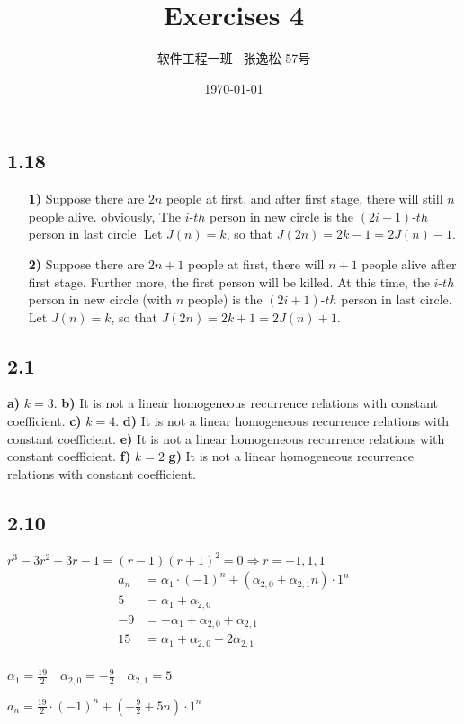 \documentclass[10pt]{ctexart}
\title{Exercises 4}
\author{软件工程一班 \ 张逸松 57号}
\date{\today}
\begin{document}
    \maketitle
    \subsection*{1.18}
        \begin{itemize}
            \item [\textbf{1)}] Suppose there are $2n$ people at first, and after first stage, there will still $n$ people alive. obviously, The $i$-$th$ person in new circle is the $(2i - 1)$-$th$ person in last circle. Let $J(n) = k$, so that $J(2n) = 2k - 1 = 2J(n) - 1$.
            \item [\textbf{2)}] Suppose there are $2n + 1$ people at first, there will $n + 1$ people alive after first stage. Further more, the first person will be killed. At this time, the $i$-$th$ person in new circle (with $n$ people) is the $(2i + 1)$-$th$ person in last circle. Let $J(n) = k$, so that $J(2n) = 2k + 1 = 2J(n) + 1$.
        \end{itemize}

    \subsection*{2.1}
        \textbf{a)} $k = 3$. \quad \textbf{b)} It is not a linear homogeneous recurrence relations with constant coefficient. \quad \textbf{c)} $k = 4$. \quad \textbf{d)} It is not a linear homogeneous recurrence relations with constant coefficient. \quad \textbf{e)} It is not a linear homogeneous recurrence relations with constant coefficient. \quad \textbf{f)} $k = 2$ \quad \textbf{g)} It is not a linear homogeneous recurrence relations with constant coefficient. \quad

    \subsection*{2.10}
        $r^3 - 3r^2 - 3r - 1 = (r - 1){(r + 1)}^2 = 0 \Rightarrow r = -1, 1, 1$
        \begin{equation}
            \begin{aligned}
                a_n &= \alpha_1\cdot(-1)^n + (\alpha_{2,0} + \alpha_{2,1}n)\cdot 1^n \\
                5 &= \alpha_1 + \alpha_{2,0} \\
                -9 &= -\alpha_1 + \alpha_{2,0} + \alpha_{2,1} \\
                15 &= \alpha_1 + \alpha_{2,0} + 2\alpha_{2,1} \\
            \end{aligned}            
        \end{equation}
        \par $\alpha_1 = \frac{19}{2} \quad \alpha_{2,0} = -\frac{9}{2} \quad \alpha_{2,1} = 5$
        \par $a_n = \frac{19}{2}\cdot(-1)^n + (-\frac{9}{2} + 5n)\cdot 1^n$
\end{document}
